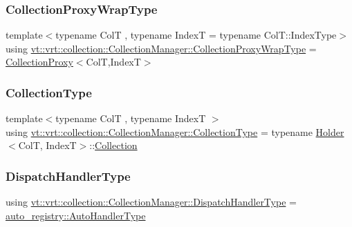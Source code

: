 \subsubsection{\texorpdfstring{Collection\+Proxy\+Wrap\+Type}{CollectionProxyWrapType}}
{\footnotesize\ttfamily template$<$typename ColT , typename IndexT  = typename Col\+T\+::\+Index\+Type$>$ \\
using \hyperlink{structvt_1_1vrt_1_1collection_1_1_collection_manager_a56458ed7f9bb22b631b9b3a745f42f94}{vt\+::vrt\+::collection\+::\+Collection\+Manager\+::\+Collection\+Proxy\+Wrap\+Type} =  \hyperlink{structvt_1_1vrt_1_1collection_1_1_collection_proxy}{Collection\+Proxy}$<$ColT,IndexT$>$}

\mbox{\label{structvt_1_1vrt_1_1collection_1_1_collection_manager_ad20a11229c9e9efe69135c207047bf85}} 
\subsubsection{\texorpdfstring{Collection\+Type}{CollectionType}}
{\footnotesize\ttfamily template$<$typename ColT , typename IndexT $>$ \\
using \hyperlink{structvt_1_1vrt_1_1collection_1_1_collection_manager_ad20a11229c9e9efe69135c207047bf85}{vt\+::vrt\+::collection\+::\+Collection\+Manager\+::\+Collection\+Type} =  typename \hyperlink{structvt_1_1vrt_1_1collection_1_1_holder}{Holder}$<$ColT, IndexT$>$\+::\hyperlink{structvt_1_1vrt_1_1collection_1_1_collection}{Collection}}

\mbox{\label{structvt_1_1vrt_1_1collection_1_1_collection_manager_a0cfe02a0426e95ec9daa2ef7374e07c7}} 
\subsubsection{\texorpdfstring{Dispatch\+Handler\+Type}{DispatchHandlerType}}
{\footnotesize\ttfamily using \hyperlink{structvt_1_1vrt_1_1collection_1_1_collection_manager_a0cfe02a0426e95ec9daa2ef7374e07c7}{vt\+::vrt\+::collection\+::\+Collection\+Manager\+::\+Dispatch\+Handler\+Type} =  \hyperlink{namespacevt_1_1auto__registry_ae295e18699146815bb7d7674594d95d7}{auto\+\_\+registry\+::\+Auto\+Handler\+Type}}

